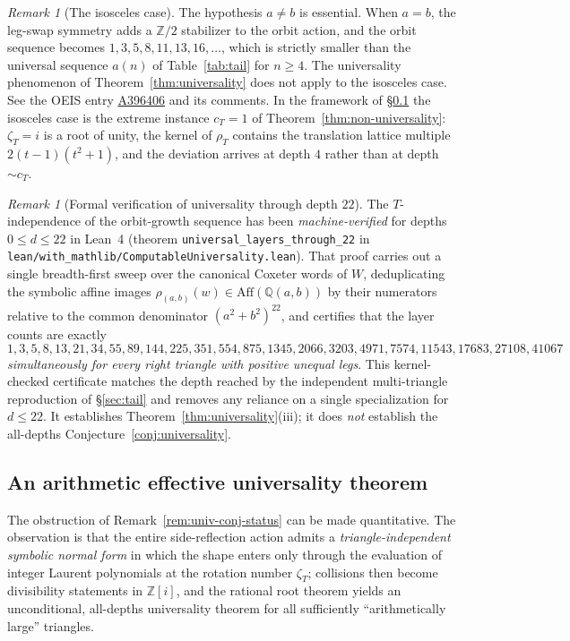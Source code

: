 \documentclass[11pt,a4paper]{article}
\theoremstyle{remark}
\newtheorem{remark}[theorem]{Remark}
\theoremstyle{plain}
\begin{document}
\begin{remark}[The isosceles case]
\label{rem:isosceles-excluded}
The hypothesis $a \ne b$ is essential.  When $a = b$, the leg-swap symmetry
adds a $\mathbb{Z}/2$ stabilizer to the orbit action, and the orbit sequence
becomes $1, 3, 5, 8, 11, 13, 16, \ldots$, which is strictly smaller than
the universal sequence $a(n)$ of Table~\ref{tab:tail} for $n \ge 4$.  The
universality phenomenon of Theorem~\ref{thm:universality} does not apply
to the isosceles case.  See the OEIS entry \href{https://oeis.org/A396406}{A396406}
and its comments.  In the framework of \S\ref{ssec:arith-univ} the
isosceles case is the extreme instance $c_T = 1$ of
Theorem~\ref{thm:non-universality}: $\zeta_T = i$ is a root of unity,
the kernel of $\rho_T$ contains the translation lattice multiple
$2(t-1)(t^2+1)$, and the deviation arrives at depth $4$ rather than at
depth $\sim c_T$.
\end{remark}

\begin{remark}[Formal verification of universality through depth $22$]
\label{rem:lean-universality}
The $T$-independence of the orbit-growth sequence
has been \emph{machine-verified} for depths $0 \le d \le 22$ in Lean~4
(theorem \texttt{universal\_layers\_through\_22} in
\texttt{lean/with\_mathlib/ComputableUniversality.lean}).  That proof
carries out a single breadth-first sweep over the canonical Coxeter words
of $W$, deduplicating the symbolic affine images
$\rho_{(a,b)}(w) \in \mathrm{Aff}(\mathbb{Q}(a,b))$ by their numerators
relative to the common denominator $(a^2+b^2)^{22}$, and certifies that
the layer counts are exactly
\[
1, 3, 5, 8, 13, 21, 34, 55, 89, 144, 225, 351, 554, 875, 1345,
2066, 3203, 4971, 7574, 11543, 17683, 27108, 41067
\]
\emph{simultaneously for every right triangle with positive unequal
legs}.  This kernel-checked certificate matches the depth reached by the
independent multi-triangle reproduction of \S\ref{sec:tail} and removes
any reliance on a single specialization for $d \le 22$.  It establishes
Theorem~\ref{thm:universality}(iii); it does \emph{not} establish the
all-depths Conjecture~\ref{conj:universality}.
\end{remark}

\subsection{An arithmetic effective universality theorem}
\label{ssec:arith-univ}

The obstruction of Remark~\ref{rem:univ-conj-status} can be made
quantitative.  The observation is that the entire side-reflection action
admits a \emph{triangle-independent symbolic normal form} in which the
shape enters only through the evaluation of integer Laurent polynomials
at the rotation number $\zeta_T$; collisions then become divisibility
statements in $\mathbb{Z}[i]$, and the rational root theorem yields an
unconditional, all-depths universality theorem for all sufficiently
``arithmetically large'' triangles.
\end{document}

